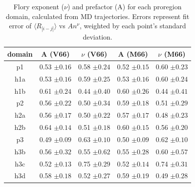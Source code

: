 \documentclass[journal=jacsat,manuscript=article]{achemso}
\begin{document}
\begin{table}[ht]
\caption{Flory exponent ($\nu$) and prefactor (A) for each proregion domain, calculated from MD trajectories. Errors represent fit error of $\langle R_{|i-j|}\rangle$ vs  $An^{\nu}$, weighted by each point's standard deviation.}
\label{t1}
\begin{tabular}{|c|c|c|c|c|}
\hline
domain & A (V66)  & $\nu$ (V66) & A (M66)  & $\nu$ (M66)\\          
\hline
p1 &  0.53 $\pm{ 0.16}$ & 0.58 $\pm{ 0.24}$ &  0.52 $\pm{0.15}$ & 0.60 $\pm{0.23}$ \\
\hline
h1a &  0.53 $\pm{ 0.16}$ & 0.59 $\pm{ 0.25}$ &  0.53 $\pm{0.16}$ & 0.60 $\pm{0.24}$ \\
\hline
h1b & 0.61  $\pm{0.24 }$ &0.44  $\pm{0.40 }$ &  0.60 $\pm{0.26}$ & 0.44 $\pm{0.41}$ \\
\hline
p2 & 0.56  $\pm{0.22 }$ &0.50  $\pm{0.34 }$ &  0.59 $\pm{0.18}$ & 0.51 $\pm{0.29}$ \\
\hline
h2a &  0.56 $\pm{ 0.17}$ & 0.50 $\pm{ 0.22}$ &  0.57 $\pm{0.17}$ & 0.48 $\pm{0.23}$ \\
\hline
h2b &  0.64 $\pm{ 0.14}$ & 0.51 $\pm{ 0.18}$ &  0.60 $\pm{0.15}$ & 0.56 $\pm{0.20}$ \\
\hline
p3 &  0.49 $\pm{ 0.09}$ & 0.63 $\pm{ 0.10}$ &  0.50 $\pm{0.09}$ & 0.62 $\pm{0.10}$ \\
\hline
h3b &  0.56 $\pm{ 0.32}$ & 0.55 $\pm{ 0.62}$ &  0.55 $\pm{0.28}$ & 0.60 $\pm{0.57}$ \\
\hline
h3c &  0.52 $\pm{ 0.13}$ & 0.75 $\pm{ 0.29}$ &  0.52 $\pm{0.14}$ & 0.74 $\pm{0.31}$ \\
\hline
h3d & 0.58  $\pm{0.18 }$ &0.52  $\pm{0.27 }$ &  0.59 $\pm{0.19}$ & 0.49 $\pm{0.28}$ \\
\hline
\end{tabular}

\end{table}
\end{document}
